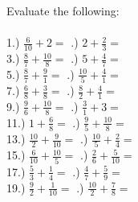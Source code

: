 \documentclass[12pt]{article}
\begin{document}
Evaluate the following:
\\\\

1.) $\frac{6}{10} + 2 = $ \underline{\hspace{2cm}} \indent\indent\indent{}.) $2 + \frac{2}{3} = $ \underline{\hspace{2cm}} 
\\

3.) $\frac{8}{7} + \frac{10}{8} = $ \underline{\hspace{2cm}} \indent\indent\indent{}.) $5 + \frac{4}{7} = $ \underline{\hspace{2cm}} 
\\

5.) $\frac{8}{7} + \frac{9}{1} = $ \underline{\hspace{2cm}} \indent\indent\indent{}.) $\frac{10}{5} + \frac{4}{1} = $ \underline{\hspace{2cm}} 
\\

7.) $\frac{6}{8} + \frac{3}{8} = $ \underline{\hspace{2cm}} \indent\indent\indent{}.) $\frac{8}{2} + \frac{4}{1} = $ \underline{\hspace{2cm}} 
\\

9.) $\frac{9}{6} + \frac{10}{8} = $ \underline{\hspace{2cm}} \indent\indent\indent{}.) $\frac{3}{1} + 3 = $ \underline{\hspace{2cm}} 
\\

11.) $1 + \frac{6}{8} = $ \underline{\hspace{2cm}} \indent\indent\indent{}.) $\frac{9}{5} + \frac{10}{8} = $ \underline{\hspace{2cm}} 
\\

13.) $\frac{10}{2} + \frac{9}{10} = $ \underline{\hspace{2cm}} \indent\indent\indent{}.) $\frac{10}{5} + \frac{2}{4} = $ \underline{\hspace{2cm}} 
\\

15.) $\frac{6}{10} + \frac{10}{5} = $ \underline{\hspace{2cm}} \indent\indent\indent{}.) $\frac{2}{6} + \frac{5}{10} = $ \underline{\hspace{2cm}} 
\\

17.) $\frac{5}{3} + \frac{1}{4} = $ \underline{\hspace{2cm}} \indent\indent\indent{}.) $\frac{4}{7} + \frac{5}{9} = $ \underline{\hspace{2cm}} 
\\

19.) $\frac{9}{2} + \frac{1}{10} = $ \underline{\hspace{2cm}} \indent\indent\indent{}.) $\frac{10}{2} + \frac{7}{8} = $ \underline{\hspace{2cm}} 
\\
\end{document}
